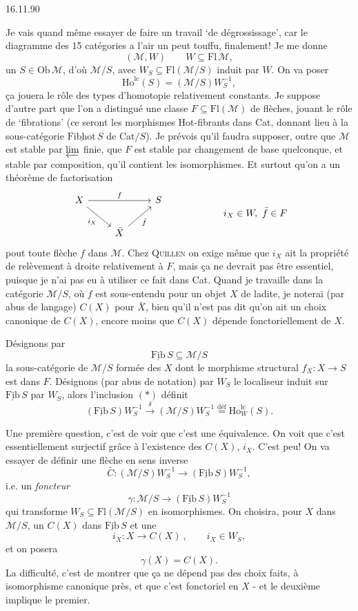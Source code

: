 \documentclass[11pt]{article}
\newcommand{\printedpage}[1]{\marginpar{\footnotesize p.~#1}}
\newcommand{\msp}[1]{\marginpar{\footnotesize [#1]}}
\newcommand{\cM}{\mathcal{M}}
\newcommand{\Fib}{\underline{\mathrm{Fib}}\,}
\newcommand{\Fibhot}{\underline{\mathrm{Fibhot}}\,}
\newcommand{\Ho}{\mathrm{Ho}}
\newcommand{\Fl}{\mathrm{Fl}}
\newcommand{\Ob}{\mathrm{Ob}}
\begin{document}
\printedpage{54}

\begin{flushright}
16.11.90
\end{flushright}

Je vais quand même essayer de faire un travail ‘de dégrossissage’, car le diagramme des
15 catégories a l'air un peut touffu, %
finalement! Je me donne
\[
(\cM,W) \qquad W\subseteq \Fl\,\cM,
\]
un $S\in\Ob\,\cM$, d'où $\cM/S$, avec $W_S\subseteq\Fl(\cM/S)$ induit par $W$. On va poser
\[
\Ho^{\mathrm{lc}}(S)=(\cM/S)W_S^{-1},
\]
ça jouera le rôle des types d'homotopie relativement constants. Je suppose d'autre part
que l'on a distingué une classe $F\subseteq\Fl(\cM)$ de flèches, jouant le rôle de ‘fibrations’ (ce
seront les morphismes Hot-fibrants dans Cat, donnant lieu à la sous-catégorie $\Fibhot S$
de $\mathrm{Cat}/S$). Je prévois qu'il faudra
\msp{page 86}supposer, outre que $\cM$ est stable par $\varprojlim$ finie, que $F$ est stable par changement de base
quelconque, et stable par composition, qu'il contient les isomorphismes. Et surtout qu'on
a un théorème de factorisation
\[
\begin{tikzcd}
X \arrow[rr, "f"] \arrow[dr, "i_X"'] & & S \\
& \bar{X} \arrow[ur, "\bar{f}"'] &
\end{tikzcd}
\qquad\qquad\qquad
i_X\in W,\ \bar{f}\in F
\]
pout %
toute flèche $f$ dans $\cM$. Chez \textsc{Quillen} on exige même que $i_X$ ait la propriété de
relèvement à droite relativement à $F$, mais ça ne devrait pas être essentiel, puisque je n'ai
pas eu à utiliser ce fait dans Cat. Quand je travaille dans la catégorie $\cM/S$, où $f$ est
sous-entendu pour un objet $X$ de ladite, je noterai (par abus de langage) $C(X)$ pour $\bar{X}$,
bien qu'il n'est pas dit qu'on ait un choix canonique de $C(X)$, encore moins que $C(X)$
dépende fonctoriellement de $X$.

Désignons par
\[
\Fib S\subseteq\cM/S \tag*{$(*)$}
\]
la sous-catégorie de $\cM/S$ formée des $X$ dont le morphisme structural $f_X:X\longrightarrow S$ est
dans $F$. Désignons (par abus de notation) par $W_S$ le localiseur induit sur $\Fib S$ par $W_S$,
alors l'inclusion $(*)$ définit
\[
(\Fib S)W_S^{-1}\xrightarrow{\ \delta\ }(\cM/S)W_S^{-1}\overset{\text{déf}}{=}\Ho^{\mathrm{lc}}_W(S).
\]

\msp{page 87}Une première question, c'est de voir que c'est une équivalence. On voit que c'est essentiellement
surjectif grâce à l'existence des $C(X)$, $i_X$. C'est peu! On va essayer de définir
une flèche en sens inverse
\[
\bar{C}:(\cM/S)W_S^{-1}\longrightarrow(\Fib S)W_S^{-1},
\]
\printedpage{55}
i.e. un \textit{foncteur}
\[
\gamma:\cM/S\longrightarrow(\Fib S)W_S^{-1}
\]
qui transforme $W_S\subseteq\Fl(\cM/S)$ en isomorphismes. On choisira, pour $X$ dans $\cM/S$, un
$C(X)$ dans $\Fib S$ et une
\[
i_X:X\longrightarrow C(X)\ , \qquad i_X\in W_S,
\]
et on posera
\[
\gamma(X)=C(X).
\]
La difficulté, c'est de montrer que ça ne dépend pas des choix faits, à isomorphisme
canonique près, et que c'est fonctoriel en $X$ - et le deuxième implique le premier.
\end{document}
